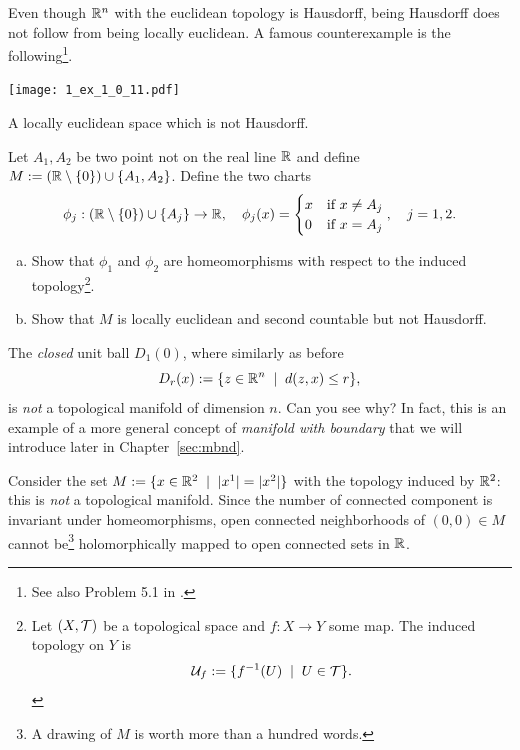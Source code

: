 \begin{exercise}
	Even though $\mathbb{R}^n$ with the euclidean topology is Hausdorff, being Hausdorff does not follow from being locally euclidean. A famous counterexample is the following\footnote{See also Problem 5.1 in \cite{book:tu}.}.
  \begin{marginfigure}
    \texttt{[image: 1\_ex\_1\_0\_11.pdf]}
    \label{fig:hausdorff-not-locally-euclidean}
    \caption{A locally euclidean space which is not Hausdorff.}
  \end{marginfigure}
  Let $A_1, A_2$ be two point not on the real line $\mathbb{R}$ and define $M:= (\mathbb{R}\setminus\{0\})\cup\{A_1,A_2\}$.
  Define the two charts
  \begin{equation}
  \phi_j:(\mathbb{R}\setminus\{0\})\cup\{A_j\} \to \mathbb{R}, \quad
  \phi_j(x) = \begin{cases} x &\mbox{if } x\neq A_j\\ 0 & \mbox{if } x = A_j \end{cases}, \quad
  j = 1,2.
  \end{equation}
  \begin{enumerate}[(a)]
    \item Show that $\phi_1$ and $\phi_2$ are homeomorphisms with respect to the induced topology\footnote{Let $(X, \mathcal{T})$ be a topological space and $f: X\to Y$ some map. The induced topology on $Y$ is \begin{equation}\mathcal{U}_f := \{f^{-1}(U) \;\mid\; U\in\mathcal{T}\}.\end{equation}}.
    \item Show that $M$ is locally euclidean and second countable but not Hausdorff.
  \end{enumerate}
\end{exercise}

\begin{example}\label{ex:uball}
  The \emph{closed} unit ball $D_1(0)$, where similarly as before
  \begin{equation}
    D_r(x) := \{z\in\mathbb{R}^n \;\mid\; d(z,x) \leq r\},
  \end{equation}
  is \emph{not} a topological manifold of dimension $n$. Can you see why? In fact, this is an example of a more general concept of \emph{manifold with boundary} that we will introduce later in Chapter~\ref{sec:mbnd}.
\end{example}

\begin{example}
	Consider the set $M := \{ x\in\mathbb{R}^2 \;\mid\; |x^1| = |x^2| \}$ with the topology induced by $\mathbb{R}^2$:
   this is \emph{not} a topological manifold.
	Since the number of connected component is invariant under homeomorphisms, open connected neighborhoods of $(0,0)\in M$ cannot be\footnote{A drawing of $M$ is worth more than a hundred words.} holomorphically mapped to open connected sets in $\mathbb{R}$.
\end{example}

